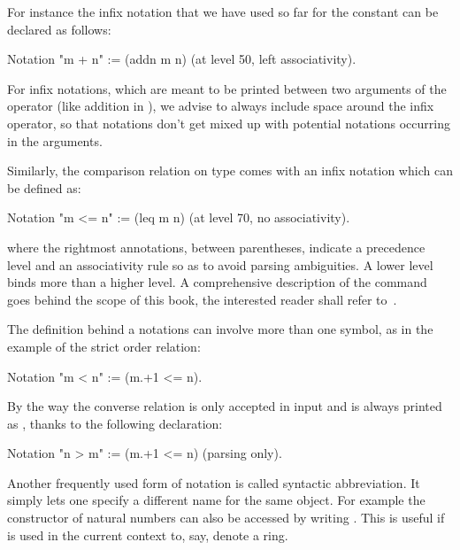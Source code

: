 For instance the infix notation that we have used so far for the
constant  can be declared as follows:

\begin{coq}{}{}
Notation "m + n" := (addn m n) (at level 50, left associativity).
\end{coq}

For infix notations, which are meant to be printed between two arguments
of the operator (like addition in ), we advise to always include
space around the infix operator, so that notations don't get mixed up with
potential notations occurring in the arguments.


Similarly, the comparison relation  on type  comes with
an infix notation \C{<=} which can be defined as:

\begin{coq}{}{}
Notation "m <= n" := (leq m n) (at level 70, no associativity).
\end{coq}

where the rightmost annotations, between parentheses, indicate a
precedence level and an associativity rule so as to avoid parsing
ambiguities. A lower level binds more than a higher level. A comprehensive
description of the  command goes behind the scope of this
book, the interested reader shall refer to~\cite[Chapter 12]{Coq:manual}.

The definition behind a notations can involve more than one symbol,
as in the example of the strict order relation:


\begin{coq}{}{}
Notation "m < n"  := (m.+1 <= n).
\end{coq}


By the way the converse relation  is only accepted in input
and is always printed as  , thanks to the following declaration:

\begin{coq}{}{}
Notation "n > m"  := (m.+1 <= n) (parsing only).
\end{coq}

Another frequently used form of notation is called syntactic abbreviation.
It simply lets one specify a different name for the same object.
For example the  constructor of natural numbers can also be accessed
by writing .  This is useful if  is used in the current context
to, say, denote a ring.

